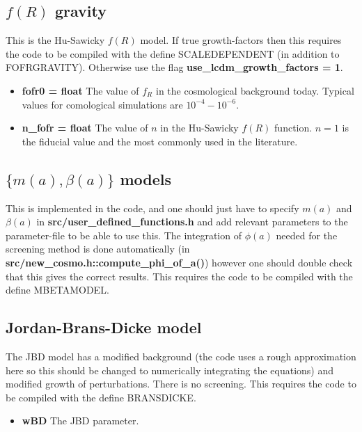 \documentclass[usenatbib]{article}
\begin{document}
\subsection*{$f(R)$ gravity}

This is the Hu-Sawicky $f(R)$ model. If true growth-factors then this requires the code to be compiled with the define SCALEDEPENDENT (in addition to FOFRGRAVITY). Otherwise use the flag \textbf{use\_lcdm\_growth\_factors = 1}.

\begin{itemize}

\item \textbf{fofr0 = float} The value of $f_R$ in the cosmological background today. Typical values for comological simulations are $10^{-4}-10^{-6}$.

\item \textbf{n\_fofr = float} The value of $n$ in the Hu-Sawicky $f(R)$ function. $n=1$ is the fiducial value and the most commonly used in the literature.

\end{itemize}

\subsection*{$\{m(a),\beta(a)\}$ models}

This is implemented in the code, and one should just have to specify $m(a)$ and $\beta(a)$ in \textbf{src/user\_defined\_functions.h} and add relevant parameters to the parameter-file to be able to use this. The integration of $\phi(a)$ needed for the screening method is done automatically (in \textbf{src/new\_cosmo.h::compute\_phi\_of\_a()}) however one should double check that this gives the correct results. This requires the code to be compiled with the define MBETAMODEL.

\subsection*{Jordan-Brans-Dicke model}

The JBD model has a modified background (the code uses a rough approximation here so this should be changed to numerically integrating the equations) and modified growth of perturbations. There is no screening. This requires the code to be compiled with the define BRANSDICKE.

\begin{itemize}

\item \textbf{wBD} The JBD parameter.

\end{itemize}
\end{document}
